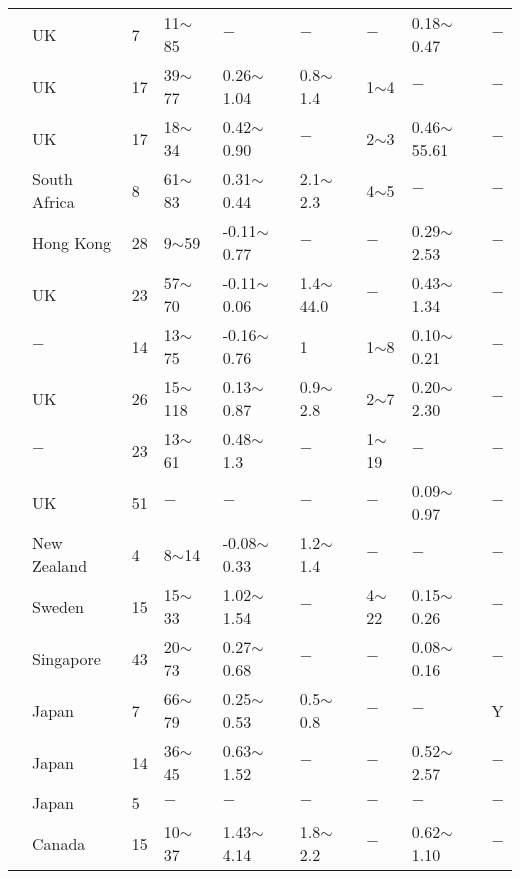 {\begin{longtable}{lllllllll}
    \citet{Simons1976183} & UK    & 7     & 11$\sim$85 & $-$     & $-$     & $-$     & 0.18$\sim$0.47 & $-$ \\
    \citet{Skempton1948145} & UK    & 17    & 39$\sim$77 & 0.26$\sim$1.04 & 0.8$\sim$1.4 & 1$\sim$4   & $-$     & $-$ \\
    \citet{Skempton1948111} & UK    & 17    & 18$\sim$34 & 0.42$\sim$0.90 & $-$     & 2$\sim$3   & 0.46$\sim$55.61 & $-$ \\
    \citet{Skempton1950304} & South Africa & 8     & 61$\sim$83 & 0.31$\sim$0.44 & 2.1$\sim$2.3 & 4$\sim$5   & $-$     & $-$ \\
    \citet{Skempton1957305} & Hong Kong & 28    & 9$\sim$59  & -0.11$\sim$0.77 & $-$     & $-$     & 0.29$\sim$2.53 & $-$ \\
    \citet{Skempton1961351} & UK    & 23    & 57$\sim$70 & -0.11$\sim$0.06 & 1.4$\sim$44.0 & $-$     & 0.43$\sim$1.34 & $-$ \\
    \citet{Skempton1954417} & $-$     & 14    & 13$\sim$75 & -0.16$\sim$0.76 & 1     & 1$\sim$8   & 0.10$\sim$0.21 & $-$ \\
    \citet{Skempton1953302} & UK    & 26    & 15$\sim$118 & 0.13$\sim$0.87 & 0.9$\sim$2.8 & 2$\sim$7   & 0.20$\sim$2.30 & $-$ \\
    \citet{Skempton195330} & $-$     & 23    & 13$\sim$61 & 0.48$\sim$1.3 & $-$     & 1$\sim$19  & $-$     & $-$ \\
    \citet{Skempton1963269} & UK    & 51    & $-$     & $-$     & $-$     & $-$     & 0.09$\sim$0.97 & $-$ \\
    \citet{Strachan1960135} & New Zealand & 4     & 8$\sim$14  & -0.08$\sim$0.33 & 1.2$\sim$1.4 & $-$     & $-$     & $-$ \\
    \citet{Stille1979285} & Sweden & 15    & 15$\sim$33 & 1.02$\sim$1.54 & $-$     & 4$\sim$22  & 0.15$\sim$0.26 & $-$ \\
    \citet{Tan2003429} & Singapore & 43    & 20$\sim$73 & 0.27$\sim$0.68 & $-$     & $-$     & 0.08$\sim$0.16 & $-$ \\
    \citet{Tanaka1989563} & Japan & 7     & 66$\sim$79 & 0.25$\sim$0.53 & 0.5$\sim$0.8 & $-$     & $-$     & Y \\
    \citet{Tanaka2003455} & Japan & 14    & 36$\sim$45 & 0.63$\sim$1.52 & $-$     & $-$     & 0.52$\sim$2.57 & $-$ \\
    \citet{Tani199537} & Japan & 5     & $-$     & $-$     & $-$     & $-$     & $-$     & $-$ \\
    \citet{Tavenas1975450} & Canada & 15    & 10$\sim$37 & 1.43$\sim$4.14 & 1.8$\sim$2.2 & $-$     & 0.62$\sim$1.10 & $-$ \\

\end{longtable}}
